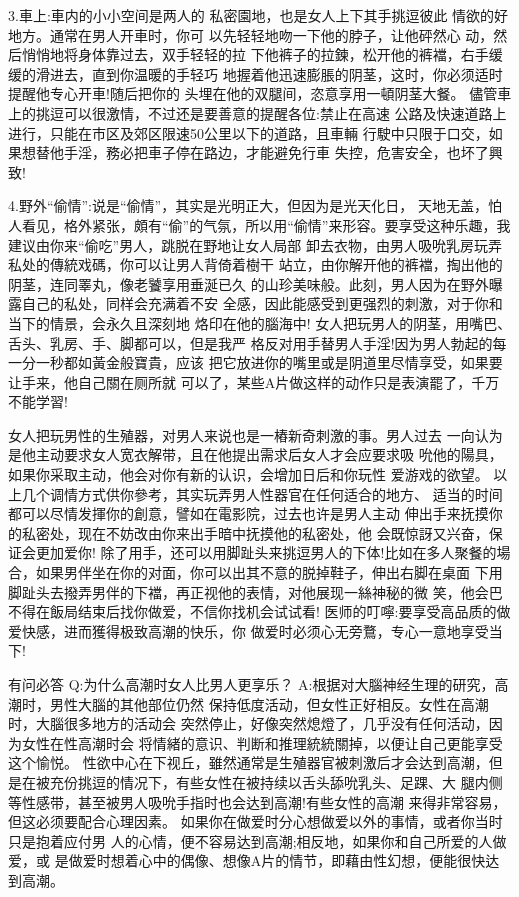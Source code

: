 \documentclass[12pt,UTF8]{ctexbook}
\begin{document}
3.車上:車内的小小空间是两人的
私密園地，也是女人上下其手挑逗彼此
情欲的好地方。通常在男人开車时，你可
以先轻轻地吻一下他的脖子，让他砰然心
动，然后悄悄地将身体靠过去，双手轻轻的拉
下他裤子的拉鍊，松开他的裤襠，右手缓缓的滑进去，直到你温暖的手轻巧
地握着他迅速膨脹的阴茎，这时，你必须适时提醒他专心开車!随后把你的
头埋在他的双腿间，恣意享用一頓阴茎大餐。
儘管車上的挑逗可以很激情，不过还是要善意的提醒各位:禁止在高速
公路及快速道路上进行，只能在市区及郊区限速50公里以下的道路，且車輛
行駛中只限于口交，如果想替他手淫，務必把車子停在路边，才能避免行車
失控，危害安全，也坏了興致!

4.野外“偷情”:说是“偷情”，其实是光明正大，但因为是光天化日，
天地无盖，怕人看见，格外紧张，頗有“偷”的气氛，所以用“偷情”来形容。要享受这种乐趣，我建议由你来“偷吃”男人，跳脱在野地让女人局部
卸去衣物，由男人吸吮乳房玩弄私处的傳統戏碼，你可以让男人背倚着樹干
站立，由你解开他的裤襠，掏出他的阴茎，连同睪丸，像老饕享用垂涎已久
的山珍美味般。此刻，男人因为在野外曝露自己的私处，同样会充满着不安
全感，因此能感受到更强烈的刺激，对于你和当下的情景，会永久且深刻地
烙印在他的腦海中!
女人把玩男人的阴茎，用嘴巴、舌头、乳房、手、脚都可以，但是我严
格反对用手替男人手淫!因为男人勃起的每一分一秒都如黃金般寶貴，应该
把它放进你的嘴里或是阴道里尽情享受，如果要让手来，他自己關在厕所就
可以了，某些A片做这样的动作只是表演罷了，千万不能学習!

女人把玩男性的生殖器，对男人来说也是一樁新奇刺激的事。男人过去
一向认为是他主动要求女人宽衣解带，且在他提出需求后女人才会应要求吸
吮他的陽具，如果你采取主动，他会对你有新的认识，会增加日后和你玩性
爱游戏的欲望。
以上几个调情方式供你參考，其实玩弄男人性器官在任何适合的地方、
适当的时间都可以尽情发揮你的創意，譬如在電影院，过去也许是男人主动
伸出手来抚摸你的私密处，现在不妨改由你来出手暗中抚摸他的私密处，他
会既惊訝又兴奋，保证会更加爱你!
除了用手，还可以用脚趾头来挑逗男人的下体!比如在多人聚餐的場
合，如果男伴坐在你的对面，你可以出其不意的脱掉鞋子，伸出右脚在桌面
下用脚趾头去撥弄男伴的下襠，再正视他的表情，对他展现一絲神秘的微
笑，他会巴不得在飯局结束后找你做爱，不信你找机会试试看!
医师的叮嚀:要享受高品质的做爱快感，进而獲得极致高潮的快乐，你
做爱时必须心无旁鶩，专心一意地享受当下!

有问必答
Q:为什么高潮时女人比男人更享乐？
A:根据对大腦神经生理的研究，高潮时，男性大腦的其他部位仍然
保持低度活动，但女性正好相反。女性在高潮时，大腦很多地方的活动会
突然停止，好像突然熄燈了，几乎没有任何活动，因为女性在性高潮时会
将情緒的意识、判断和推理統統關掉，以便让自己更能享受这个愉悦。
性欲中心在下视丘，雖然通常是生殖器官被刺激后才会达到高潮，但
是在被充份挑逗的情况下，有些女性在被持续以舌头舔吮乳头、足踝、大
腿内侧等性感带，甚至被男人吸吮手指时也会达到高潮!有些女性的高潮
来得非常容易，但这必须要配合心理因素。
如果你在做爱时分心想做爱以外的事情，或者你当时只是抱着应付男
人的心情，便不容易达到高潮;相反地，如果你和自己所爱的人做爱，或
是做爱时想着心中的偶像、想像A片的情节，即藉由性幻想，便能很快达
到高潮。
\end{document}
